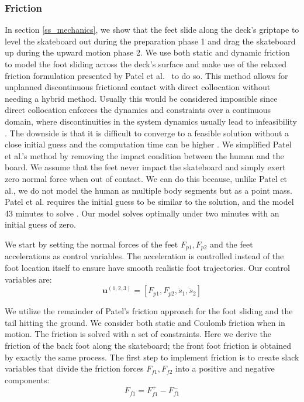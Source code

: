 \documentclass[default,iicol]{sn-jnl}
\begin{document}
{\subsubsection{Friction}
In section \ref{ss_mechanics}, we show that the feet slide along the deck's
griptape to level the skateboard out during the preparation phase 1 and drag
the skateboard up during the upward motion phase 2.
We use both static and dynamic friction to model the foot sliding across the
deck's surface and make use of the relaxed friction formulation presented by
Patel et al.~\cite{patel_contact-implicit_2019} to do so.
This method allows for unplanned discontinuous frictional contact with direct
collocation without needing a hybrid method.
Usually this would be considered impossible since direct collocation enforces
the dynamics and constraints over a continuous domain, where discontinuities in
the system dynamics usually lead to infeasibility
\cite{kelly_transcription_2017}.
The downside is that it is difficult to converge to a feasible solution without
a close initial guess and the computation time can be higher
\cite{shield_contact-implicit_2022,patel_contact-implicit_2019}.
We simplified Patel et al.'s method by removing the impact condition between
the human and the board.
We assume that the feet never impact the skateboard and simply exert zero
normal force when out of contact.
We can do this because, unlike Patel et al., we do not model the human as
multiple body segments but as a point mass.
Patel et al. requires the initial guess to be similar to the solution, and the
model 43 minutes to solve \cite{shield_contact-implicit_2022}. Our model solves
optimally under two minutes with an initial guess of zero.

We start by setting the normal forces of the feet $F_{p1},F_{p2}$ and the feet
accelerations as control variables.
The acceleration is controlled instead of the foot location itself to ensure
have smooth realistic foot trajectories.
Our control variables are:
%
\begin{equation}
    \mathbf{u}^{(1,2,3)} = [F_{p1},F_{p2},\ddot s_1, \ddot s_2]
\end{equation}

We utilize the remainder of Patel's friction approach for the foot sliding and
the tail hitting the ground. We consider both static and Coulomb friction when
in motion.
The friction is solved with a set of constraints.
Here we derive the friction of the back foot along the skateboard; the front
foot friction is obtained by exactly the same process.
The first step to implement friction is to create slack variables that divide
the friction forces $F_{f1},F_{f2}$ into a positive and negative components:
%
\begin{equation} \label{e_plusminfric}
   F_{f1} = F_{f1}^+ - F_{f1}^-
\end{equation}

}
\end{document}
